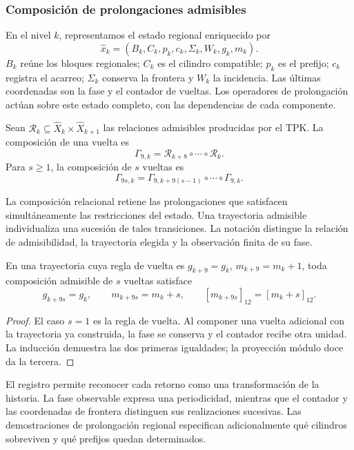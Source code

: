 \subsubsection{Composición de prolongaciones admisibles}

En el nivel $k$, representamos el estado regional enriquecido por
\[
 \widehat x_k=(B_k,C_k,p_k,c_k,\Sigma_k,W_k,g_k,m_k).
\]
$B_k$ reúne los bloques regionales; $C_k$ es el cilindro compatible;
$p_k$ es el prefijo; $c_k$ registra el acarreo; $\Sigma_k$ conserva la
frontera y $W_k$ la incidencia. Las últimas coordenadas son la fase y
el contador de vueltas. Los operadores de prolongación actúan sobre
este estado completo, con las dependencias de cada componente.

\begin{definicion}
Sean $\mathcal R_k\subseteq\widehat X_k\times\widehat X_{k+1}$
las relaciones admisibles producidas por el TPK. La composición de una
vuelta es
\[
 \Gamma_{9,k}=\mathcal R_{k+8}\circ\cdots\circ\mathcal R_k.
\]
Para $s\geq1$, la composición de $s$ vueltas es
\[
 \Gamma_{9s,k}=
 \Gamma_{9,k+9(s-1)}\circ\cdots\circ\Gamma_{9,k}.
\]
\end{definicion}

La composición relacional retiene las prolongaciones que satisfacen
simultáneamente las restricciones del estado. Una trayectoria admisible
individualiza una sucesión de tales transiciones. La notación distingue
la relación de admisibilidad, la trayectoria elegida y la observación
finita de su fase.

\begin{proposicion}
\label{prop:cal-memoria}
En una trayectoria cuya regla de vuelta es
$g_{k+9}=g_k$, $m_{k+9}=m_k+1$, toda composición admisible de $s$
vueltas satisface
\[
 g_{k+9s}=g_k,\qquad m_{k+9s}=m_k+s,
 \qquad [m_{k+9s}]_{12}=[m_k+s]_{12}.
\]
\end{proposicion}
\begin{proof}
El caso $s=1$ es la regla de vuelta. Al componer una vuelta adicional
con la trayectoria ya construida, la fase se conserva y el contador
recibe otra unidad. La inducción demuestra las dos primeras igualdades;
la proyección módulo doce da la tercera.
\end{proof}

El registro permite reconocer cada retorno como una transformación de
la historia. La fase observable expresa una periodicidad, mientras que
el contador y las coordenadas de frontera distinguen sus realizaciones
sucesivas. Las demostraciones de prolongación regional especifican
adicionalmente qué cilindros sobreviven y qué prefijos quedan determinados.

